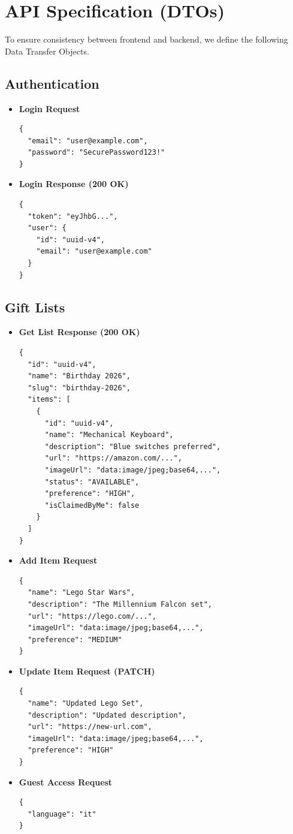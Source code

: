 \section{API Specification (DTOs)}
To ensure consistency between frontend and backend, we define the following Data Transfer Objects.

\subsection{Authentication}
\begin{itemize}
    \item \textbf{Login Request}
\begin{verbatim}
{
  "email": "user@example.com",
  "password": "SecurePassword123!"
}
\end{verbatim}
    \item \textbf{Login Response (200 OK)}
\begin{verbatim}
{
  "token": "eyJhbG...",
  "user": {
    "id": "uuid-v4",
    "email": "user@example.com"
  }
}
\end{verbatim}
\end{itemize}

\subsection{Gift Lists}
\begin{itemize}
    \item \textbf{Get List Response (200 OK)}
\begin{verbatim}
{
  "id": "uuid-v4",
  "name": "Birthday 2026",
  "slug": "birthday-2026",
  "items": [
    {
      "id": "uuid-v4",
      "name": "Mechanical Keyboard",
      "description": "Blue switches preferred",
      "url": "https://amazon.com/...",
      "imageUrl": "data:image/jpeg;base64,...",
      "status": "AVAILABLE",
      "preference": "HIGH",
      "isClaimedByMe": false
    }
  ]
}
\end{verbatim}
    \item \textbf{Add Item Request}
\begin{verbatim}
{
  "name": "Lego Star Wars",
  "description": "The Millennium Falcon set",
  "url": "https://lego.com/...",
  "imageUrl": "data:image/jpeg;base64,...",
  "preference": "MEDIUM"
}
\end{verbatim}
    \item \textbf{Update Item Request (PATCH)}
\begin{verbatim}
{
  "name": "Updated Lego Set",
  "description": "Updated description",
  "url": "https://new-url.com",
  "imageUrl": "data:image/jpeg;base64,...",
  "preference": "HIGH"
}
\end{verbatim}
    \item \textbf{Guest Access Request}
\begin{verbatim}
{
  "language": "it"
}
\end{verbatim}
\end{itemize}

